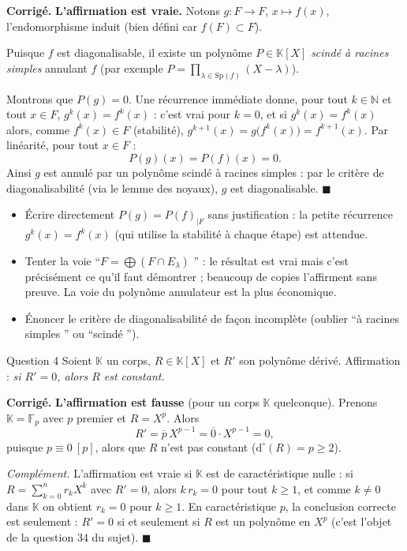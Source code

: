 \documentclass[11pt,a4paper]{article}
\newenvironment{corrige}
  {\par\medskip\noindent
   \begin{tcolorbox}[blanker, breakable,
     borderline west={2.5pt}{0pt}{vertP},
     left=10pt, top=2pt, bottom=2pt]
   {\color{vertP}\bfseries Corrigé.}\hspace{0.5em}\ignorespaces}
  {\hfill$\blacksquare$\end{tcolorbox}\medskip}
\newcommand{\og}{``}
\newcommand{\fg}{''}
\newcommand{\K}{\mathbb{K}}
\newcommand{\N}{\mathbb{N}}
\newcommand{\Fp}{\mathbb{F}_p}
\newcommand{\dg}[1]{\mathrm{d}^{\circ}\!\left(#1\right)}
\newcommand{\red}[1]{\overline{#1}}       %
\begin{document}
\begin{corrige}
\textbf{L'affirmation est vraie.}
Notons $g:F\to F$, $x\mapsto f(x)$, l'endomorphisme induit (bien
défini car $f(F)\subset F$).

Puisque $f$ est diagonalisable, il existe un polynôme
$P\in\K[X]$ \emph{scindé à racines simples} annulant $f$ (par exemple
$P=\prod_{\lambda\in\mathrm{Sp}(f)}(X-\lambda)$).

Montrons que $P(g)=0$. Une récurrence immédiate donne, pour tout
$k\in\N$ et tout $x\in F$, $g^{k}(x)=f^{k}(x)$ : c'est vrai pour
$k=0$, et si $g^k(x)=f^k(x)$ alors, comme $f^k(x)\in F$ (stabilité),
$g^{k+1}(x)=g\big(f^k(x)\big)=f^{k+1}(x)$. Par linéarité, pour tout
$x\in F$ :
\[
P(g)(x)=P(f)(x)=0 .
\]
Ainsi $g$ est annulé par un polynôme scindé à racines simples : par le
critère de diagonalisabilité (via le lemme des noyaux), $g$ est
diagonalisable.
\end{corrige}

\begin{pieges}
\begin{itemize}[leftmargin=1.4em, itemsep=2pt]
\item Écrire directement $P(g)=P(f)_{|F}$ sans justification : la
petite récurrence $g^k(x)=f^k(x)$ (qui utilise la stabilité à chaque
étape) est attendue.
\item Tenter la voie \og $F=\bigoplus (F\cap E_\lambda)$ \fg{} : le
résultat est vrai mais c'est précisément ce qu'il faut démontrer ;
beaucoup de copies l'affirment sans preuve. La voie du polynôme
annulateur est la plus économique.
\item Énoncer le critère de diagonalisabilité de façon incomplète
(oublier \og à racines simples \fg{} ou \og scindé \fg).
\end{itemize}
\end{pieges}

\begin{enonce}{Question 4}
Soient $\K$ un corps, $R\in\K[X]$ et $R'$ son polynôme dérivé.
Affirmation : \emph{si $R'=0$, alors $R$ est constant.}
\end{enonce}

\begin{corrige}
\textbf{L'affirmation est fausse} (pour un corps $\K$ quelconque).
Prenons $\K=\Fp$ avec $p$ premier et $R=X^{p}$. Alors
\[
R'=\red{p}\,X^{p-1}=\red{0}\cdot X^{p-1}=0,
\]
puisque $p\equiv 0\ [p]$, alors que $R$ n'est pas constant
($\dg{R}=p\ge 2$).

\emph{Complément.} L'affirmation est vraie si $\K$ est de
caractéristique nulle : si $R=\sum_{k=0}^{n}r_kX^k$ avec $R'=0$,
alors $k\,r_k=0$ pour tout $k\ge 1$, et comme $k\neq 0$ dans $\K$
on obtient $r_k=0$ pour $k\ge 1$. En caractéristique $p$, la
conclusion correcte est seulement : $R'=0$ si et seulement si $R$ est
un polynôme en $X^{p}$ (c'est l'objet de la question 34 du sujet).
\end{corrige}
\end{document}
